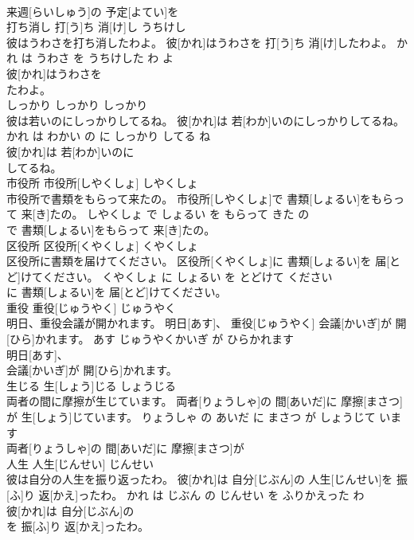 \documentclass[8pt]{extreport}
\begin{document}
\begin{CJK}{UTF8}{min}
\\	来週[らいしゅう]の 予定[よてい]を
\\	打ち消し	打[う]ち 消[け]し	うちけし	
\\	彼はうわさを打ち消したわよ。	彼[かれ]はうわさを 打[う]ち 消[け]したわよ。	かれ は うわさ を うちけした わ よ	
\\	彼[かれ]はうわさを
\\	たわよ。			
\\	しっかり	しっかり	しっかり	
\\	彼は若いのにしっかりしてるね。	彼[かれ]は 若[わか]いのにしっかりしてるね。	かれ は わかい の に しっかり してる ね	
\\	彼[かれ]は 若[わか]いのに
\\	してるね。			
\\	市役所	市役所[しやくしょ]	しやくしょ	
\\	市役所で書類をもらって来たの。	市役所[しやくしょ]で 書類[しょるい]をもらって 来[き]たの。	しやくしょ で しょるい を もらって きた の	
\\	で 書類[しょるい]をもらって 来[き]たの。			
\\	区役所	区役所[くやくしょ]	くやくしょ	
\\	区役所に書類を届けてください。	区役所[くやくしょ]に 書類[しょるい]を 届[とど]けてください。	くやくしょ に しょるい を とどけて ください	
\\	に 書類[しょるい]を 届[とど]けてください。			
\\	重役	重役[じゅうやく]	じゅうやく	
\\	明日、重役会議が開かれます。	明日[あす]、 重役[じゅうやく] 会議[かいぎ]が 開[ひら]かれます。	あす じゅうやくかいぎ が ひらかれます	
\\	明日[あす]、
\\	会議[かいぎ]が 開[ひら]かれます。			
\\	生じる	生[しょう]じる	しょうじる	
\\	両者の間に摩擦が生じています。	両者[りょうしゃ]の 間[あいだ]に 摩擦[まさつ]が 生[しょう]じています。	りょうしゃ の あいだ に まさつ が しょうじて います	
\\	両者[りょうしゃ]の 間[あいだ]に 摩擦[まさつ]が
\\	人生	人生[じんせい]	じんせい	
\\	彼は自分の人生を振り返ったわ。	彼[かれ]は 自分[じぶん]の 人生[じんせい]を 振[ふ]り 返[かえ]ったわ。	かれ は じぶん の じんせい を ふりかえった わ	
\\	彼[かれ]は 自分[じぶん]の
\\	を 振[ふ]り 返[かえ]ったわ。			

\end{CJK}
\end{document}
